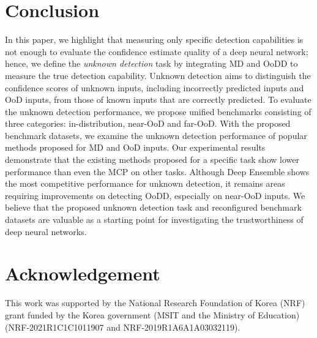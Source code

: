 \documentclass[preprint,12pt]{elsarticle}
\begin{document}
\section{Conclusion}
In this paper, we highlight that measuring only specific detection capabilities is not enough to evaluate the confidence estimate quality of a deep neural network; hence, we define the \emph{unknown detection} task by integrating MD and OoDD to measure the true detection capability. Unknown detection aims to distinguish the confidence scores of unknown inputs, including incorrectly predicted inputs and OoD inputs, from those of known inputs that are correctly predicted. To evaluate the unknown detection performance, we propose unified benchmarks consisting of three categories: in-distribution, near-OoD and far-OoD. With the proposed benchmark datasets, we examine the unknown detection performance of popular methods proposed for MD and OoD inputs. Our experimental results demonstrate that the existing methods proposed for a specific task show lower performance than even the MCP on other tasks. Although Deep Ensemble shows the most competitive performance for unknown detection, it remains areas requiring improvements on detecting OoDD, especially on near-OoD inputs. We believe that the proposed unknown detection task and reconfigured benchmark datasets are valuable as a starting point for investigating the trustworthiness of deep neural networks.

\section*{Acknowledgement}
\noindent This work was supported by the National Research Foundation of Korea (NRF) grant funded by the Korea government (MSIT and the Ministry of Education) (NRF-2021R1C1C1011907 and NRF-2019R1A6A1A03032119).

\end{document}
